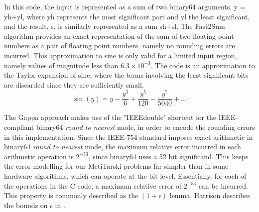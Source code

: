 \documentclass{fac}
\begin{document}
In this code, the input is represented as a sum of two binary64 arguments, y = yh+yl, where yh represents the most significant part and yl the least significant, and the result, s, is similarly represented as a sum sh+sl. The Fast2Sum algorithm provides an exact representation of the sum of two floating point numbers as a pair of floating point numbers, namely no rounding errors are incurred. This approximation to sine is only valid for a limited input region, namely values of magnitude less than $6.3\times 10^{-3}$. The code is an approximation to the Taylor expansion of sine, where the terms involving the least significant bits are discarded since they are sufficiently small. 
\begin{equation}
    \sin{(y)} = y - \frac{y^3}{6} + \frac{y^5}{120} - \frac{y^7}{5040} + ... 
\end{equation}

The Gappa approach makes use of the "IEEEdouble" shortcut for the IEEE-compliant binary64 \textit{round to nearest} mode, in order to encode the rounding errors in this implementation. Since the IEEE-754 standard imposes exact arithmetic in binary64 \textit{round to nearest} mode, the maximum relative error incurred in each arithmetic operation is $2^{-53}$, since binary64 uses a 52 bit significand. This keeps the error modelling for our MetiTarski problems far simpler than in some hardware algorithms, which can operate at the bit level. Essentially, for each of the operations in the C code, a maximum relative error of $2^{-53}$ can be incurred. This property is commonly described as the $(1+\epsilon)$ lemma. Harrison describes the bounds on $\epsilon$ in \cite{harrison2006floating}.
\end{document}
